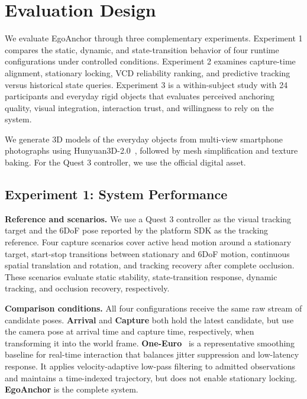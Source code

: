 \documentclass[review]{vgtc}
\begin{document}
\section{Evaluation Design}\label{sec:evaluation}

We evaluate EgoAnchor through three complementary experiments. Experiment 1 compares the static, dynamic, and state-transition behavior of four runtime configurations under controlled conditions. Experiment 2 examines capture-time alignment, stationary locking, VCD reliability ranking, and predictive tracking versus historical state queries. Experiment 3 is a within-subject study with 24 participants and everyday rigid objects that evaluates perceived anchoring quality, visual integration, interaction trust, and willingness to rely on the system.

We generate 3D models of the everyday objects from multi-view smartphone photographs using Hunyuan3D-2.0~\cite{hunyuan3d22025tencent}, followed by mesh simplification and texture baking. For the Quest 3 controller, we use the official digital asset.

\subsection{Experiment 1: System Performance}\label{sec:exp1-design}

\textbf{Reference and scenarios.}
We use a Quest 3 controller as the visual tracking target and the 6DoF pose reported by the platform SDK as the tracking reference. Four capture scenarios cover active head motion around a stationary target, start-stop transitions between stationary and 6DoF motion, continuous spatial translation and rotation, and tracking recovery after complete occlusion. These scenarios evaluate static stability, state-transition response, dynamic tracking, and occlusion recovery, respectively.

\textbf{Comparison conditions.}
All four configurations receive the same raw stream of candidate poses. \textbf{Arrival} and \textbf{Capture} both hold the latest candidate, but use the camera pose at arrival time and capture time, respectively, when transforming it into the world frame. \textbf{One-Euro}~\cite{casiez2012oneeuro} is a representative smoothing baseline for real-time interaction that balances jitter suppression and low-latency response. It applies velocity-adaptive low-pass filtering to admitted observations and maintains a time-indexed trajectory, but does not enable stationary locking. \textbf{EgoAnchor} is the complete system.
\end{document}
